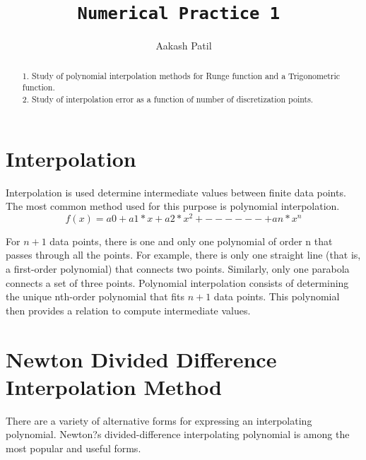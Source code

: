 \documentclass[preprint,12pt,3p]{elsarticle}
\begin{document}
\begin{frontmatter}

\title{ \texttt{Numerical Practice 1 }}


\author{Aakash Patil}
\address{aakash.patil@master.centralelille.fr}


\begin{abstract}
1. Study of polynomial interpolation methods for Runge function and a Trigonometric function.  
\\
2. Study of interpolation error as a function of number of discretization points.
\end{abstract}


\end{frontmatter}


\section{Interpolation}
Interpolation is used determine intermediate values between finite data points. The most common method used for this purpose is polynomial interpolation.$$ f(x) = a0 + a1 *x+a2 *x ^2 +------ + an *x^ n$$

For $n + 1$ data points, there is one and only one polynomial of order n that passes through all the points. For example, there is only one straight line (that is, a first-order polynomial) that connects two points. Similarly, only one parabola connects a set of three points. Polynomial interpolation consists of determining the unique nth-order polynomial that fits $n + 1$ data points. This polynomial then provides a relation to compute
intermediate values.


\section{Newton Divided Difference Interpolation Method}
There are a variety of alternative forms for expressing an interpolating
polynomial. Newton?s divided-difference interpolating polynomial is among the most popular and useful forms. 
\end{document}
